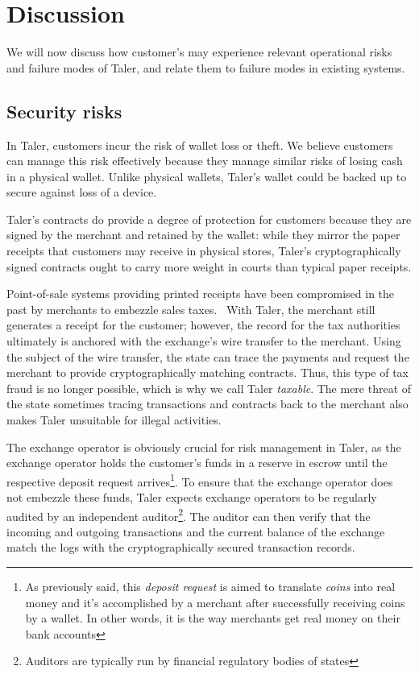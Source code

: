\documentclass{IEEEtran}
\begin{document}
\section{Discussion}

We will now discuss how customer's may experience relevant operational
risks and failure modes of Taler, and relate them to failure modes
in existing systems.

\subsection{Security risks}

In Taler, customers incur the risk of wallet loss or theft.  We
believe customers can manage this risk effectively because they manage
similar risks of losing cash in a physical wallet.  Unlike physical
wallets, Taler's wallet could be backed up to secure against loss of a
device.

Taler's contracts do provide a degree of protection for customers
because they are signed by the merchant and retained by the wallet:
while they mirror the paper receipts that customers may receive in
physical stores, Taler's cryptographically signed contracts ought to
carry more weight in courts than typical paper receipts.

Point-of-sale systems providing printed receipts have been compromised
in the past by merchants to embezzle sales
taxes.~\cite{munichicecream} With Taler, the merchant still generates
a receipt for the customer; however, the record for the tax
authorities ultimately is anchored with the exchange's wire transfer
to the merchant.  Using the subject of the wire transfer, the state
can trace the payments and request the merchant to provide
cryptographically matching contracts.  Thus, this type of tax
fraud is no longer possible, which is why we call Taler {\em
taxable}.  The mere threat of the state sometimes tracing transactions
and contracts back to the merchant also makes Taler unsuitable for
illegal activities.

The exchange operator is obviously crucial for risk management in
Taler, as the exchange operator holds the customer's funds in a
reserve in escrow until the respective deposit request arrives\footnote{As
previously said, this {\it deposit request} is aimed to translate {\it coins}
into real money and it's accomplished by a merchant after successfully
receiving coins by a wallet. In other words, it is the way merchants get
real money on their bank accounts}. To ensure that the exchange operator
does not embezzle these funds, Taler expects exchange operators to be
regularly audited by an independent auditor\footnote{Auditors are typically
run by financial regulatory bodies of states}.  The auditor can then verify that the incoming and outgoing
transactions and the current balance of the exchange match the logs
with the cryptographically secured transaction records.
\end{document}
